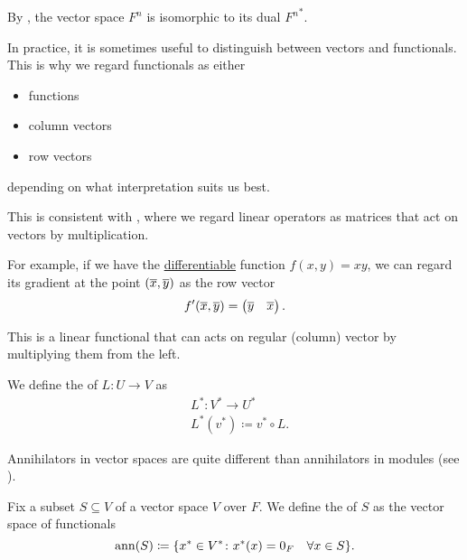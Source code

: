 \begin{Remark}\label{remark:finite_dimensional_dual_space_isomorphism}
  By , the vector space \( F^n \) is isomorphic to its dual \( {F^n}^* \).

  In practice, it is sometimes useful to distinguish between vectors and functionals. This is why we regard functionals as either
  \begin{itemize}
    \item functions
    \item column vectors
    \item row vectors
  \end{itemize}
  depending on what interpretation suits us best.

  This is consistent with , where we regard linear operators as matrices that act on vectors by multiplication.

  For example, if we have the \hyperref[def:differentiability]{differentiable} function \( f(x, y) = xy \), we can regard its gradient at the point \( (\overline{x}, \overline{y}) \) as the row vector
  \begin{align*}
    f'(\overline{x}, \overline{y}) =
    \begin{pmatrix}
      \overline{y} & \overline{x}
    \end{pmatrix}.
  \end{align*}

  This is a linear functional that can acts on regular (column) vector by multiplying them from the left.
\end{Remark}

\begin{Definition}\label{def:dual_linear_operator}
  We define the  of \( L: U \to V \) as
  \begin{align*}
    &L^*: V^* \to U^* \\
    &L^*(v^*) \coloneqq v^* \circ L.
  \end{align*}
\end{Definition}

\begin{Definition}\label{def:vector_space_annihilator}\cite[52]{Knapp2016BAlg}
  Annihilators in vector spaces are quite different than annihilators in modules (see ).

  Fix a subset \( S \subseteq V \) of a vector space \( V \) over \( F \). We define the  of \( S \) as the vector space of functionals
  \begin{equation*}
    \operatorname{ann}(S) \coloneqq \{ x^* \in V^* \colon x^*(x) = 0_F \quad\forall x \in S \}.
  \end{equation*}
\end{Definition}
